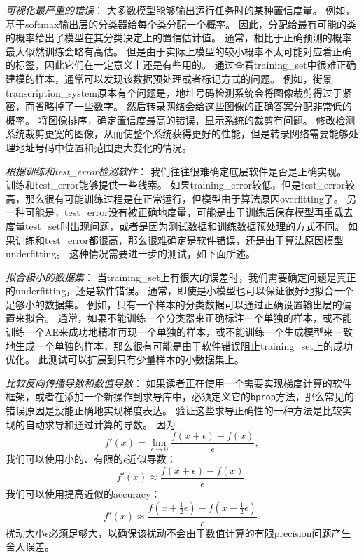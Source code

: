 \emph{可视化最严重的错误}：
大多数模型能够输出运行任务时的某种置信度量。
例如，基于\gls{softmax}输出层的分类器给每个类分配一个概率。
因此，分配给最有可能的类的概率给出了模型在其分类决定上的置信估计值。
通常，相比于正确预测的概率最大似然训练会略有高估。
但是由于实际上模型的较小概率不太可能对应着正确的标签，因此它们在一定意义上还是有些用的。
通过查看\gls{training_set}中很难正确建模的样本，通常可以发现该数据预处理或者标记方式的问题。
例如，街景\gls{transcription_system}原本有个问题是，地址号码检测系统会将图像裁剪得过于紧密，而省略掉了一些数字。
然后转录网络会给这些图像的正确答案分配非常低的概率。
将图像排序，确定置信度最高的错误，显示系统的裁剪有问题。
修改检测系统裁剪更宽的图像，从而使整个系统获得更好的性能，但是转录网络需要能够处理地址号码中位置和范围更大变化的情况。


\emph{根据训练和\gls{test_error}检测软件}：
我们往往很难确定底层软件是否是正确实现。
训练和\gls{test_error}能够提供一些线索。
如果\gls{training_error}较低，但是\gls{test_error}较高，那么很有可能训练过程是在正常运行，但模型由于算法原因\gls{overfitting}了。
另一种可能是，\gls{test_error}没有被正确地度量，可能是由于训练后保存模型再重载去度量\gls{test_set}时出现问题，或者是因为测试数据和训练数据预处理的方式不同。
如果训练和\gls{test_error}都很高，那么很难确定是软件错误，还是由于算法原因模型\gls{underfitting}。
这种情况需要进一步的测试，如下面所述。


\emph{拟合极小的数据集}：
当\gls{training_set}上有很大的误差时，我们需要确定问题是真正的\gls{underfitting}，还是软件错误。
通常，即使是小模型也可以保证很好地拟合一个足够小的数据集。
例如，只有一个样本的分类数据可以通过正确设置输出层的偏置来拟合。
通常，如果不能训练一个分类器来正确标注一个单独的样本，或不能训练一个\gls{AE}来成功地精准再现一个单独的样本，或不能训练一个生成模型来一致地生成一个单独的样本，那么很有可能是由于软件错误阻止\gls{training_set}上的成功优化。
此测试可以扩展到只有少量样本的小数据集上。


\emph{比较反向传播导数和数值导数}：
如果读者正在使用一个需要实现梯度计算的软件框架，或者在添加一个新操作到求导库中，必须定义它的\texttt{bprop}方法，那么常见的错误原因是没能正确地实现梯度表达。
验证这些求导正确性的一种方法是比较实现的自动求导和通过计算的导数。
因为
\begin{equation}
	f'(x) = \lim_{\epsilon \to 0} \frac{f(x+\epsilon) - f(x)}{\epsilon},
\end{equation}
我们可以使用小的、有限的$\epsilon$近似导数：
\begin{equation}
	f'(x) \approx \frac{f(x+\epsilon) - f(x)}{\epsilon}.
\end{equation}
我们可以使用提高近似的\gls{accuracy}：
\begin{equation}
	f'(x) \approx \frac{ f(x+\frac{1}{2}\epsilon) - f(x-\frac{1}{2}\epsilon) }{\epsilon}.
\end{equation}
扰动大小$\epsilon$必须足够大，以确保该扰动不会由于数值计算的有限\gls{precision}问题产生舍入误差。

